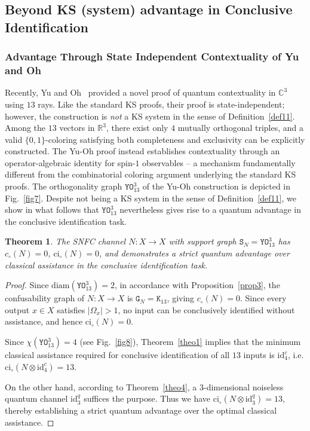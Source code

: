 \documentclass[12pt,a4paper]{article}
\newtheorem{theorem}{Theorem}
\begin{document}
\subsection{Beyond KS (system) advantage in Conclusive Identification}

\subsubsection{Advantage Through State Independent Contextuality of Yu and Oh}

\noindent Recently, Yu and Oh~\cite{Yu2012} provided a novel proof of quantum contextuality in $\mathbb{C}^3$ using $13$ rays. Like the standard KS proofs, their proof is state-independent; however, the construction is \emph{not} a KS system in the sense of Definition~\ref{def11}. Among the $13$ vectors in $\mathbb{R}^3$, there exist only $4$ mutually orthogonal triples, and a valid $\{0,1\}$-coloring satisfying both completeness and exclusivity can be explicitly constructed. The Yu-Oh proof instead establishes contextuality through an operator-algebraic identity for spin-$1$ observables -- a mechanism fundamentally different from the combinatorial coloring argument underlying the standard KS proofs. The orthogonality graph $\mathtt{YO}^3_{13}$ of the Yu-Oh construction is depicted in Fig.~\ref{fig7}. Despite not being a KS system in the sense of Definition~\ref{def11}, we show in what follows that $\mathtt{YO}^3_{13}$ nevertheless gives rise to a quantum advantage in the conclusive identification task.  



\begin{theorem}\label{theo6}
The SNFC channel $N : X \to X$ with support graph  $\mathtt{S}_N=\mathtt{YO}^3_{13}$ has $c_\circ(N) = 0$, $\mathrm{ci}_\circ(N) = 0$, and demonstrates a strict quantum advantage over classical assistance in the conclusive identification task.
\end{theorem}
\begin{proof}
Since $\mathrm{diam}(\mathtt{YO}^3_{13})=2$, in accordance with Proposition~\ref{prop3}, the confusability graph of $N: X \to X$ is $\mathtt{G}_N = \mathtt{K}_{13}$, giving $c_\circ(N) = 0$. Since every output $x \in X$ satisfies $|\Omega_x| > 1$, no input can be conclusively identified without assistance, and hence $\mathrm{ci}_\circ(N) = 0$.

\noindent Since $\chi(\mathtt{YO}^3_{13}) = 4$ (see Fig.~\ref{fig8}), Theorem~\ref{theo1} implies that the minimum classical assistance required for conclusive identification of all $13$ inputs is $\mathrm{id}^c_4$, i.e. $\mathrm{ci}_\circ(N \otimes \mathrm{id}^c_4) = 13$.

\noindent On the other hand, according to Theorem~\ref{theo4}, a $3$-dimensional noiseless quantum channel $\mathrm{id}^q_3$ suffices the purpose. Thus we have $\mathrm{ci}_\circ(N \otimes \mathrm{id}^q_3) = 13$, thereby establishing a strict quantum advantage over the optimal classical assistance.
\end{proof}
\end{document}
